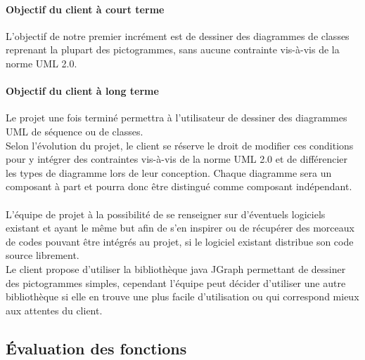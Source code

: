 \documentclass[12pt,a4paper,openany]{article}
\begin{document}
	\paragraph{Objectif du client à court terme} L'objectif de notre premier incrément est 
	de dessiner des diagrammes de classes reprenant la plupart des pictogrammes, sans aucune
	contrainte vis-à-vis de la norme UML 2.0.
	\paragraph{Objectif du client à long terme}
	Le projet une fois terminé permettra à l'utilisateur de dessiner des diagrammes UML de séquence ou de classes.\\
	Selon l'évolution du projet, le client se réserve le droit de modifier ces conditions pour y
	intégrer des contraintes vis-à-vis de la norme UML 2.0 et de différencier les types de diagramme lors de leur conception. 
	Chaque diagramme sera un composant à part et pourra donc être distingué comme composant indépendant.
	\paragraph{} L'équipe de projet à la possibilité de se renseigner sur d'éventuels logiciels
	existant et ayant le même but afin de s'en inspirer ou de récupérer des morceaux de codes pouvant être intégrés au projet, si le logiciel existant distribue son code source librement. \\
	Le client propose d'utiliser la bibliothèque java JGraph permettant de dessiner des pictogrammes simples, cependant l'équipe peut décider
	d'utiliser une autre bibliothèque si elle en trouve une plus facile d'utilisation ou qui correspond mieux aux attentes du client.
	\subsection{Évaluation des fonctions}
\end{document}
